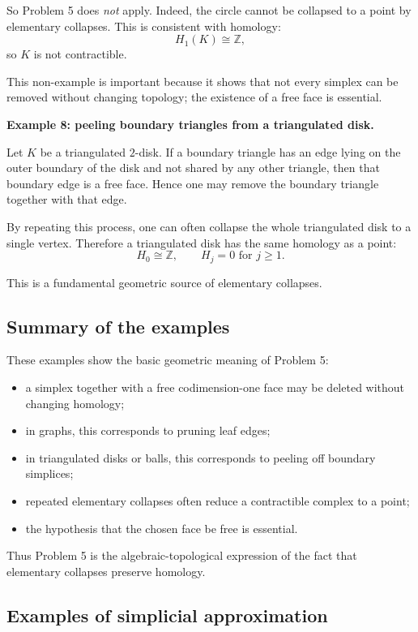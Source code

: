 \documentclass[12pt,a4paper]{article}
\theoremstyle{notespace}
\begin{document}
So Problem 5 does \emph{not} apply. Indeed, the circle cannot be collapsed to a point by elementary collapses. This is consistent with homology:
\[
H_1(K)\cong \mathbb Z,
\]
so \(K\) is not contractible.

This non-example is important because it shows that not every simplex can be removed without changing topology; the existence of a free face is essential.

\medskip

\textbf{Example 8: peeling boundary triangles from a triangulated disk.}

Let \(K\) be a triangulated \(2\)-disk. If a boundary triangle has an edge lying on the outer boundary of the disk and not shared by any other triangle, then that boundary edge is a free face. Hence one may remove the boundary triangle together with that edge.

By repeating this process, one can often collapse the whole triangulated disk to a single vertex. Therefore a triangulated disk has the same homology as a point:
\[
H_0\cong \mathbb Z,\qquad H_j=0 \text{ for } j\ge 1.
\]

This is a fundamental geometric source of elementary collapses.

\subsection{Summary of the examples}

These examples show the basic geometric meaning of Problem 5:

\begin{itemize}
	\item a simplex together with a free codimension-one face may be deleted without changing homology;
	\item in graphs, this corresponds to pruning leaf edges;
	\item in triangulated disks or balls, this corresponds to peeling off boundary simplices;
	\item repeated elementary collapses often reduce a contractible complex to a point;
	\item the hypothesis that the chosen face be free is essential.
\end{itemize}

Thus Problem 5 is the algebraic-topological expression of the fact that elementary collapses preserve homology.

\subsection{Examples of simplicial approximation}
\end{document}
